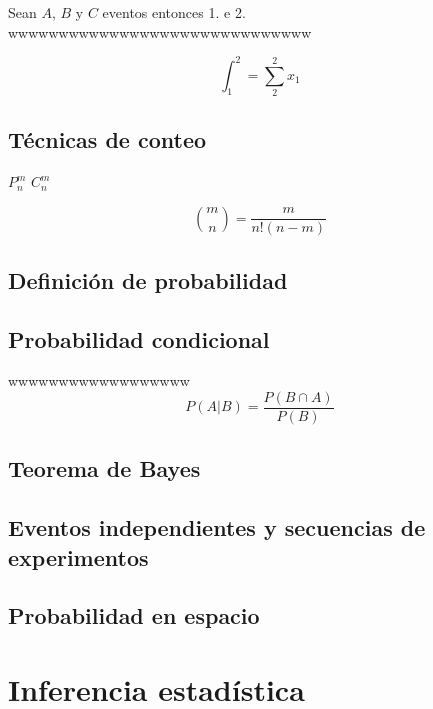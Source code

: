 \documentclass[10pt,]{krantz}
\theoremstyle{definition}
\theoremstyle{definition}
\theoremstyle{definition}
\theoremstyle{definition}
\theoremstyle{remark}
\begin{document}
Sean \(A\), \(B\) y \(C\) eventos entonces 1. e 2. wwwwwwwwwwwwwwwwwwwwwwwwwwwwww

\[ \int_{1}^{2}=\sum_{2}^{2}x_1 \]

\hypertarget{tuxe9cnicas-de-conteo}{%
\chapter{Técnicas de conteo}\label{tuxe9cnicas-de-conteo}}

\(P_n^m\) \(C_n^m\)

\[\binom{m}{n}=\frac{m}{n!(n-m)}\]

\hypertarget{definiciuxf3n-de-probabilidad}{%
\chapter{Definición de probabilidad}\label{definiciuxf3n-de-probabilidad}}

\hypertarget{probabilidad-condicional}{%
\chapter{Probabilidad condicional}\label{probabilidad-condicional}}

\leavevmode\hypertarget{wwwwwwww}{}%
wwwwwwwwwwwwwwwwww\[P(A|B)= \frac{P(B\cap A)}{P(B)}\]

\hypertarget{teorema-de-bayes}{%
\chapter{Teorema de Bayes}\label{teorema-de-bayes}}

\hypertarget{eventos-independientes-y-secuencias-de-experimentos}{%
\chapter{Eventos independientes y secuencias de experimentos}\label{eventos-independientes-y-secuencias-de-experimentos}}

\hypertarget{probabilidad-en-espacio}{%
\chapter{Probabilidad en espacio}\label{probabilidad-en-espacio}}

\hypertarget{part-inferencia-estaduxedstica}{%
\part{Inferencia estadística}\label{part-inferencia-estaduxedstica}}
\end{document}
